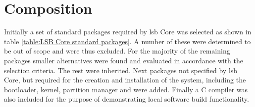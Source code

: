 \section{Composition}\label{Composition}

Initially a set of standard packages required by \gls{lsb} Core was selected as shown in table \ref{table:LSB Core standard packages}. A number of these were determined to be out of scope and were thus excluded. For the majority of the remaining packages smaller alternatives were found and evaluated in accordance with the selection criteria. The rest were inherited. Next packages not specified by \gls{lsb} Core, but required for the creation and installation of the system, including the bootloader, kernel, partition manager and  were added. Finally a C compiler was also included for the purpose of demonstrating local software build functionality.

\newpage

\newpage

\newpage

